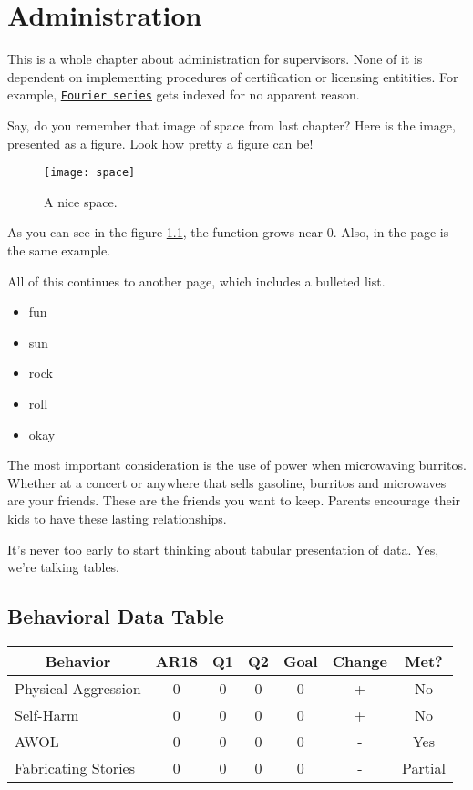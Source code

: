 \chapter{Administration}
This is a whole chapter about administration for supervisors. None of it is dependent on implementing procedures of certification or licensing entitities. For example, \underline{\texttt{\colorbox{Dandelion}{Fourier series}}}
gets indexed for no apparent reason.

Say, do you remember that image of space from last chapter? Here is the image, presented as a figure. Look how pretty a figure can be!
\begin{figure}[h]
    \centering
    \texttt{[image: space]}
    \caption{A nice space.}
    \label{fig:space1}
\end{figure}
 
As you can see in the figure \ref{fig:space1}, the 
function grows near 0. Also, in the page \pageref{fig:space1} 
is the same example.
 
All of this continues to another page, which includes a bulleted list.
\begin{itemize}
\item fun
\item sun 
\item rock
\item roll
\item okay
\end{itemize}

The most important consideration is the use of power when microwaving burritos. Whether at a concert or anywhere that sells gasoline, burritos and microwaves are your friends. These are the friends you want to keep. Parents encourage their kids to have these lasting relationships. 

It's never too early to start thinking about tabular presentation of data. Yes, we're talking tables.

\section{Behavioral Data Table}
\begin{table}[H]
\begin{tabular}{|l|cccccc|}
\hline
\multicolumn{1}{|c|}{Behavior} & AR18 & Q1 & Q2 & Goal & Change & Met?\\\hline
Physical Aggression            & 0    & 0  & 0  & 0    & +      & No\\
Self-Harm                      & 0    & 0  & 0  & 0    & +      & No\\
AWOL                           & 0    & 0  & 0  & 0    & -      & Yes\\
Fabricating Stories            & 0    & 0  & 0  & 0    & -      & Partial\\ \hline
\end{tabular}
\label{tbl:simplebehavioral}
\end{table}


